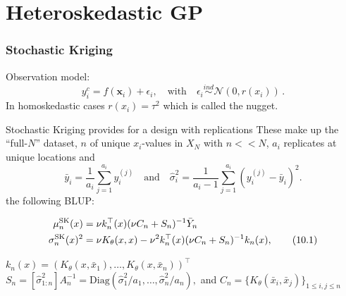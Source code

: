 \documentclass[nopagenumber,9pt]{beamer}
\newcommand{\bx}{\mathbf{x}}
\begin{document}
\section{Heteroskedastic GP}

\begin{frame}
 \frametitle{Stochastic Kriging}
 
 Observation model: $$y_i^c=f(\bx_i)+\epsilon_i,\quad \text{with}\quad \epsilon_i\overset{ind}{\sim}\mathcal{N}(0,r(x_i))\,.$$
 In homoskedastic cases $r(x_i)=\tau^2$ which is called the nugget.
 
 
 
 Stochastic Kriging provides for a design with replications
 These make up the ``full-$N$'' dataset, $n$ of unique $x_i$-values in $X_N$ with  $n<<N$, $a_i$ replicates at unique locations 
 and 
 $$\bar{y}_i = \frac{1}{a_i} \sum_{j=1}^{a_i} y_i^{(j)} \quad \mbox{and} \quad
\hat{\sigma}^2_i = \frac{1}{a_i - 1} \sum_{j=1}^{a_i} (y_i^{(j)} - \bar{y}_i)^2.$$
 the following BLUP:
 
 \begin{align}
\mu^{\mathrm{SK}}_n(x) &= \nu k_n^\top(x) (\nu C_n + S_n)^{-1} \bar{Y}_n \notag \\
\sigma^{\mathrm{SK}}_n(x)^2 &= \nu K_\theta(x,x) - \nu^2 k_n^\top(x) (\nu C_n + S_n)^{-1} k_n(x),  \tag{10.1}
\end{align}

$k_n(x) = (K_\theta(x, \bar{x}_1), \dots, K_\theta(x, \bar{x}_n))^\top$
$S_n = [\hat{\sigma}_{1:n}^2] A_n^{-1} = \mathrm{Diag}(\hat{\sigma}_1^2/a_1, \dots, \hat{\sigma}_n^2/a_n),$ and $C_n = \{ K_\theta(\bar{x}_i, \bar{x}_j)\}_{1 \leq i, j \leq n}$

\cite{ankenman}
\end{frame}
\end{document}

